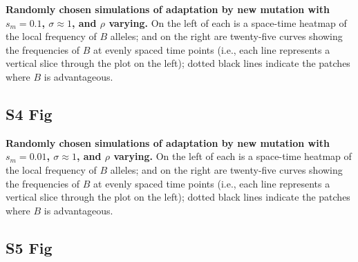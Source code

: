 \documentclass[10pt,letterpaper]{article}
\begin{document}
\textbf{Randomly chosen simulations of adaptation by new mutation
with $s_m=0.1$, $\sigma\approx 1$, and $\rho$ varying.}
    On the left of each is a space-time heatmap of the local frequency of $B$ alleles;
    and on the right are twenty-five curves showing the frequencies of $B$ at evenly spaced time points
    (i.e., each line represents a vertical slice through the plot on the left);
    dotted black lines indicate the patches where $B$ is advantageous.



\subsection*{S4 Fig}
\label{sfig:sims_2}

\textbf{Randomly chosen simulations of adaptation by new mutation
with $s_m=0.01$, $\sigma\approx 1$, and $\rho$ varying.}
    On the left of each is a space-time heatmap of the local frequency of $B$ alleles;
    and on the right are twenty-five curves showing the frequencies of $B$ at evenly spaced time points
    (i.e., each line represents a vertical slice through the plot on the left);
    dotted black lines indicate the patches where $B$ is advantageous.


\subsection*{S5 Fig}
\label{sfig:sims_3}
\end{document}
